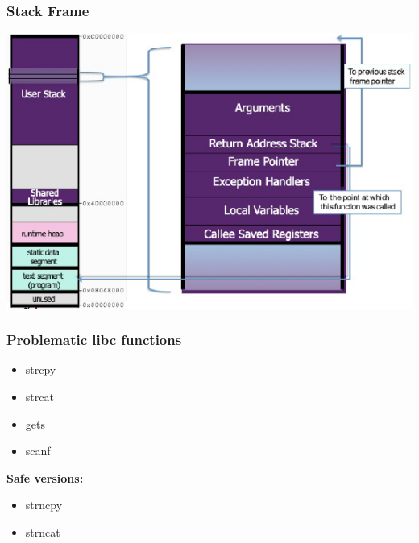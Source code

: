 \subsubsection{Stack Frame}
\includegraphics[width=0.6\linewidth]{../img/stack_frame.png}
\subsubsection{Problematic libc functions}
\begin{itemize}
    \item strcpy
    \item strcat
    \item gets
    \item scanf
\end{itemize}
\textbf{Safe versions:}
\begin{itemize}
    \item strncpy
    \item strncat
\end{itemize}

